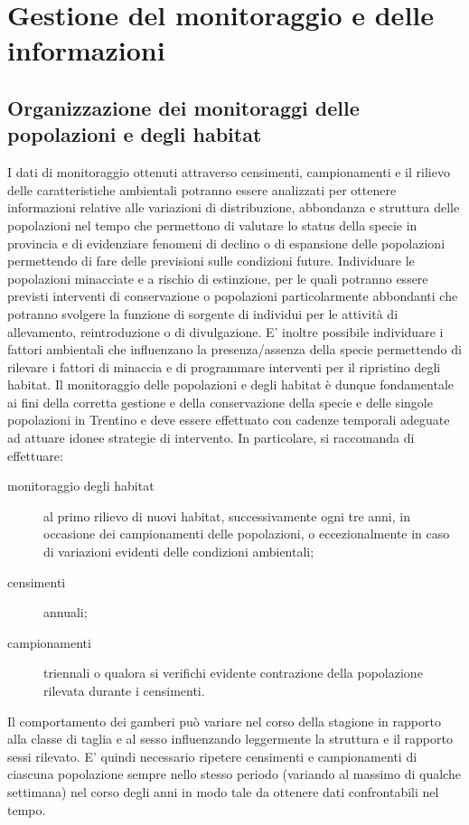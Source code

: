 \documentclass[11pt,a4paper,italian,twoside,openany]{memoir}
\begin{document}
\section{Gestione del monitoraggio e delle informazioni}
\subsection{Organizzazione dei monitoraggi delle popolazioni e degli habitat}
I dati di monitoraggio ottenuti attraverso censimenti, campionamenti e il rilievo delle caratteristiche ambientali potranno essere analizzati per ottenere informazioni relative alle  variazioni di distribuzione, abbondanza e struttura delle popolazioni nel tempo che permettono di valutare lo status della specie in provincia e di evidenziare fenomeni di declino o di espansione delle popolazioni permettendo di fare delle previsioni sulle condizioni future. Individuare le popolazioni minacciate e a rischio di estinzione, per le quali potranno essere previsti interventi di conservazione o popolazioni particolarmente abbondanti che potranno svolgere la funzione di sorgente di individui per le attività di allevamento, reintroduzione o di divulgazione. E' inoltre possibile individuare i fattori ambientali che influenzano la presenza/assenza della specie permettendo di rilevare i fattori di minaccia e di programmare interventi per il ripristino degli habitat. Il monitoraggio delle popolazioni e degli habitat è dunque fondamentale ai fini della corretta gestione e della conservazione della specie e delle singole popolazioni in Trentino e deve essere effettuato con cadenze temporali adeguate ad attuare idonee strategie di intervento. In particolare, si raccomanda di effettuare:
\begin{description}
  \item[monitoraggio degli habitat] al primo rilievo di nuovi habitat, successivamente ogni tre anni, in occasione dei campionamenti delle popolazioni, o eccezionalmente in caso di variazioni evidenti delle condizioni ambientali;
  \item[censimenti] annuali;
  \item[campionamenti] triennali o qualora si verifichi evidente contrazione della popolazione rilevata durante i censimenti.
\end{description}

Il comportamento dei gamberi può variare nel corso della stagione in rapporto alla classe di taglia e al sesso influenzando leggermente la struttura e il rapporto sessi rilevato. E' quindi necessario ripetere censimenti e campionamenti di ciascuna popolazione sempre nello stesso periodo (variando al massimo di qualche settimana) nel corso degli anni in modo tale da ottenere dati confrontabili nel tempo. 
\end{document}
